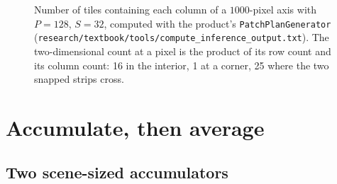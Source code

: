\begin{figure}[htbp]\centering
{}
\caption[Tiles covering each column of a 1000-pixel axis]{Number of tiles containing each column of a $1000$-pixel axis with $P=128$, $S=32$, computed with
the product's \texttt{PatchPlanGenerator} (\texttt{research/textbook/tools/compute\_inference\_output.txt}).
The two-dimensional count at a pixel is the product of its row count and its column count: 16 in the
interior, 1 at a corner, 25 where the two snapped strips cross.}\label{fig:inference:coverage}
\end{figure}

\section{Accumulate, then average}\label{sec:inference:average}

\subsection{Two scene-sized accumulators}

